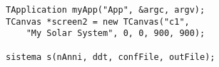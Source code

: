 \begin{lstlisting}
TApplication myApp("App", &argc, argv);
TCanvas *screen2 = new TCanvas("c1", 
    "My Solar System", 0, 0, 900, 900);

sistema s(nAnni, ddt, confFile, outFile);
\end{lstlisting}